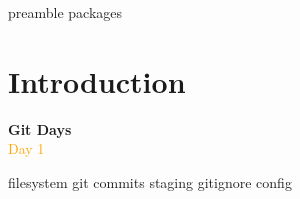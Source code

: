 \RequirePackage{import}
{preamble}
{packages}


    \section{Introduction}\label{sec:introduction}

    \begin{frame}[c]
        \centering
        \Huge
        \textbf{Git Days}
        \\
        \vspace{1ex}
        \Large
        \textcolor{orange}{Day 1}
    \end{frame}

    {filesystem}
    {git}
    {commits}
    {staging}
    {gitignore}
    {config}


